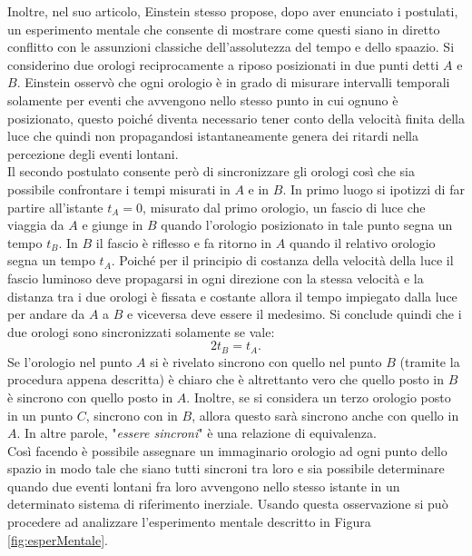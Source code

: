 Inoltre, nel suo articolo, Einstein stesso propose, dopo aver enunciato i postulati, un esperimento mentale che consente di mostrare come questi siano in diretto conflitto con le assunzioni classiche dell'assolutezza del tempo e dello spaazio. Si considerino due orologi reciprocamente a riposo posizionati in due punti detti $A$ e $B$. Einstein osservò che ogni orologio è in grado di misurare intervalli temporali solamente per eventi che avvengono nello stesso punto in cui ognuno è posizionato, questo poiché diventa necessario tener conto della velocità finita della luce che quindi non propagandosi istantaneamente genera dei ritardi nella percezione degli eventi lontani.\\ Il secondo postulato consente però di sincronizzare gli orologi così che sia possibile confrontare i tempi misurati in $A$ e in $B$. In primo luogo si ipotizzi di far partire all'istante $t_A=0$, misurato dal primo orologio, un fascio di luce che viaggia da $A$ e giunge in $B$ quando l'orologio posizionato in tale punto segna un tempo $t_B$. In $B$ il fascio è riflesso e fa ritorno in $A$ quando il relativo orologio segna un tempo $t_A$. Poiché per il principio di costanza della velocità della luce il fascio luminoso deve propagarsi in ogni direzione con la stessa velocità e la distanza tra i due orologi è fissata e costante allora il tempo impiegato dalla luce per andare da $A$ a $B$ e viceversa deve essere il medesimo. Si conclude quindi che i due orologi sono sincronizzati solamente se vale:
\begin{equation}
    2t_B=t_A.
    \label{SinconizazioneOrologi}
\end{equation}
Se l'orologio nel punto $A$ si è rivelato sincrono con quello nel punto $B$ (tramite la procedura appena descritta) è chiaro che è altrettanto vero che quello posto in $B$ è sincrono con quello posto in $A$. Inoltre, se si considera un terzo orologio posto in un punto $C$, sincrono con in $B$, allora questo sarà sincrono anche con quello in $A$. In altre parole, "\emph{essere sincroni}" è una relazione di equivalenza.\\Così facendo è possibile assegnare un immaginario orologio ad ogni punto dello spazio in modo tale che siano tutti sincroni tra loro e sia possibile determinare quando due eventi lontani fra loro avvengono nello stesso istante in un determinato sistema di riferimento inerziale.
Usando questa osservazione si può procedere ad analizzare l'esperimento mentale descritto in Figura \ref{fig:esperMentale}.
